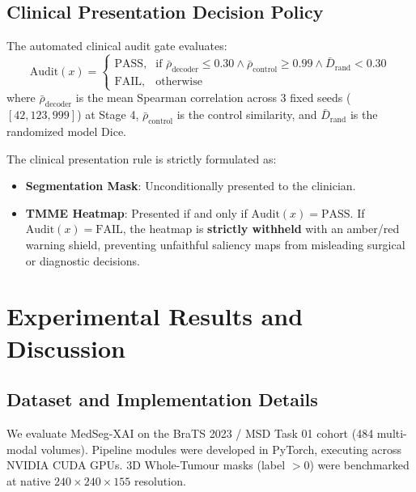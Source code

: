 \documentclass[journal,10pt,twocolumn]{IEEEtran}
\begin{document}
\subsection{Clinical Presentation Decision Policy}
The automated clinical audit gate evaluates:
\begin{equation}
    \text{Audit}(x) = 
    \begin{cases} 
        \text{PASS}, & \text{if } \bar{\rho}_{\text{decoder}} \le 0.30 \land \bar{\rho}_{\text{control}} \ge 0.99 \land \bar{D}_{\text{rand}} < 0.30 \\ 
        \text{FAIL}, & \text{otherwise} 
    \end{cases}
\end{equation}
where $\bar{\rho}_{\text{decoder}}$ is the mean Spearman correlation across 3 fixed seeds ($[42, 123, 999]$) at Stage 4, $\bar{\rho}_{\text{control}}$ is the control similarity, and $\bar{D}_{\text{rand}}$ is the randomized model Dice.

The clinical presentation rule is strictly formulated as:
\begin{itemize}
    \item \textbf{Segmentation Mask}: Unconditionally presented to the clinician.
    \item \textbf{TMME Heatmap}: Presented if and only if $\text{Audit}(x) = \text{PASS}$. If $\text{Audit}(x) = \text{FAIL}$, the heatmap is \textbf{strictly withheld} with an amber/red warning shield, preventing unfaithful saliency maps from misleading surgical or diagnostic decisions.
\end{itemize}

\section{Experimental Results and Discussion}
\label{sec:results}

\subsection{Dataset and Implementation Details}
We evaluate MedSeg-XAI on the BraTS 2023 / MSD Task 01 cohort (484 multi-modal volumes). Pipeline modules were developed in PyTorch, executing across NVIDIA CUDA GPUs. 3D Whole-Tumour masks (label $> 0$) were benchmarked at native $240 \times 240 \times 155$ resolution.
\end{document}
